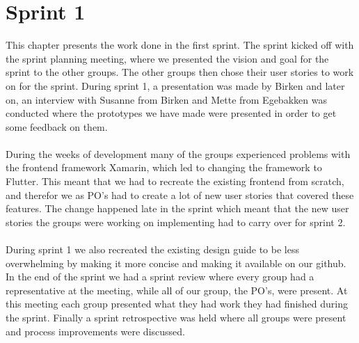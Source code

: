 \chapter{Sprint 1}
This chapter presents the work done in the first sprint.
The sprint kicked off with the sprint planning meeting, where we presented the vision and goal for the sprint to the other groups. The other groups then chose their user stories to work on for the sprint.
During sprint 1, a presentation was made by Birken and later on, an interview with Susanne from Birken and Mette from Egebakken was conducted where the prototypes we have made were presented in order to get some feedback on them. 
\\\\
During the weeks of development many of the groups experienced problems with the frontend framework Xamarin, which led to changing the framework to Flutter. This meant that we had to recreate the existing frontend from scratch, and therefor we as PO's had to create a lot of new user stories that covered these features. The change happened late in the sprint which meant that the new user stories the groups were working on implementing had to carry over for sprint 2. 
\\\\
During sprint 1 we also recreated the existing design guide to be less overwhelming by making it more concise and making it available on our github. In the end of the sprint we had a sprint review where every group had a representative at the meeting, while all of our group, the PO's, were present. At this meeting each group presented what they had work they had finished during the sprint. Finally a sprint retrospective was held where all groups were present and process improvements were discussed.